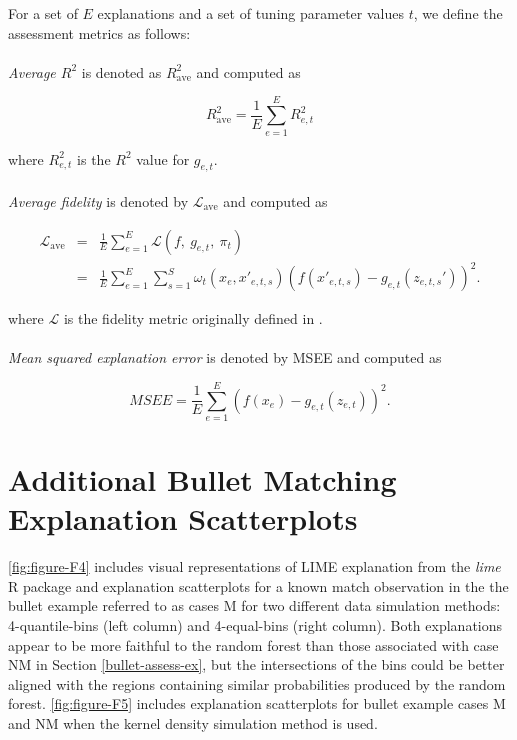 \documentclass[AMS,STIX2COL]{WileyNJD-v2}\usepackage[]{graphicx}\usepackage[]{color}
\begin{document}
For a set of $E$ explanations and a set of tuning parameter values $t$, we define the assessment metrics as follows:\\
\\
\emph{Average $R^2$} is denoted as $R^2_{\mbox{ave}}$ and computed as

  $$R^2_{\mbox{ave}} = \frac{1}{E}\sum_{e=1}^E R_{e,t}^2$$

\noindent where $R_{e,t}^2$ is the $R^2$ value for $g_{e,t}$.\\
\\
\emph{Average fidelity} is denoted by $\mathcal{L}_{\mbox{ave}}$ and computed as

\begin{eqnarray*} \mathcal{L}_{\mbox{ave}} & = & \frac{1}{E}\sum_{e=1}^E\mathcal{L}(f, \ g_{e,t}, \ \pi_{t}) \\ & = & \frac{1}{E}\sum_{e=1}^E\sum_{s=1}^{S}\omega_{t}\left(x_e, x'_{e,t,s}\right)\left(f\left(x'_{e,t,s}\right)-g_{e,t}\left(z_{e,t,s}'\right)\right)^2. \end{eqnarray*}

\noindent where $\mathcal{L}$ is the fidelity metric originally defined in \citet{ribeiro:2016}.\\
\\
\emph{Mean squared explanation error} is denoted by MSEE and computed as

$$MSEE=\frac{1}{E}\sum_{e=1}^E\left(f\left(x_e\right)-g_{e,t}\left(z_{e,t}\right)\right)^2.$$

\section{Additional Bullet Matching Explanation Scatterplots} \label{bullets-plus}

\autoref{fig:figure-F4} includes visual representations of LIME explanation from the \emph{lime} R package and explanation scatterplots for a known match observation in the the bullet example referred to as cases M for two different data simulation methods: 4-quantile-bins (left column) and 4-equal-bins (right column). Both explanations appear to be more faithful to the random forest than those associated with case NM in Section \ref{bullet-assess-ex}, but the intersections of the bins could be better aligned with the regions containing similar probabilities produced by the random forest. \autoref{fig:figure-F5} includes explanation scatterplots for bullet example cases M and NM when the kernel density simulation method is used.
\end{document}
